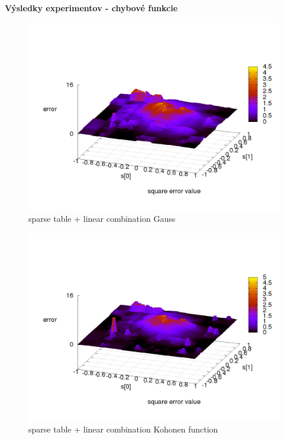 \documentclass[xcolor=dvipsnames]{beamer}
\begin{document}
\begin{frame}{\bf Výsledky experimentov - chybové funkcie}

\begin{minipage}{.5\textwidth}

\begin{figure}[!htb]
\centering
\includegraphics[scale=.2]{../../results_q_learning/map_1/function_type_3/q_learning_error.png}
\caption{sparse table + linear combination Gauss}
\end{figure}


\end{minipage}%
\begin{minipage}{.5\textwidth}

\begin{figure}[!htb]
\centering
\includegraphics[scale=.2]{../../results_q_learning/map_1/function_type_4/q_learning_error.png}
\caption{sparse table + linear combination Kohonen function}
\end{figure}


\end{minipage}
\end{frame}
\end{document}
